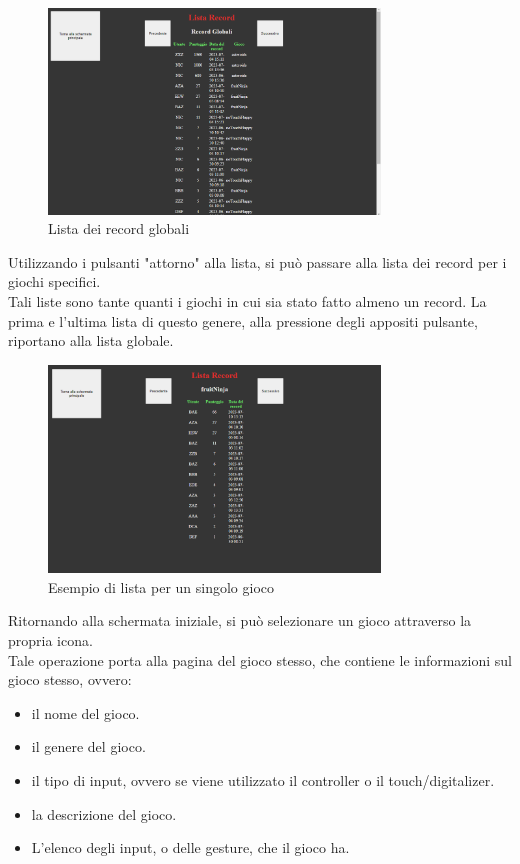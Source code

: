 \begin{figure}[h]
    \centering
    \includegraphics[width=250pt]{images/product/schermataRecord.png}
    \caption{Lista dei record globali}
    \label{fig:schermataRecord}
\end{figure}
Utilizzando i pulsanti "attorno" alla lista, si può passare alla lista dei record per i giochi specifici.\\
Tali liste sono tante quanti i giochi in cui sia stato fatto almeno un record.
La prima e l'ultima lista di questo genere, alla pressione degli appositi pulsante, riportano alla lista globale.
\begin{figure}[h]
    \centering
    \includegraphics[width=250pt]{images/product/schermataRecordSingoloGioco.png}
    \caption{Esempio di lista per un singolo gioco}
    \label{fig:schermataRecordSingoloGioco}
\end{figure}
\newpage
Ritornando alla schermata iniziale, si può selezionare un gioco attraverso la propria icona.\\
Tale operazione porta alla pagina del gioco stesso, che contiene le informazioni sul gioco stesso, ovvero:
\begin{itemize}
    \item il nome del gioco.
    \item il genere del gioco.
    \item il tipo di input, ovvero se viene utilizzato il controller o il touch/digitalizer.
    \item la descrizione del gioco.
    \item L'elenco degli input, o delle gesture, che il gioco ha.
\end{itemize}
